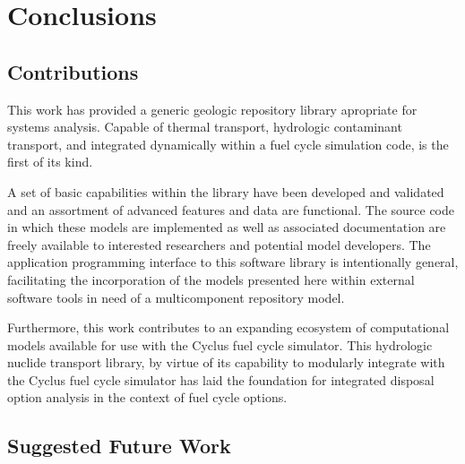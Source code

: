 \chapter{Conclusions}\label{ch:conclusion}
\section{Contributions}

This work has provided a generic geologic repository library apropriate for 
systems analysis. Capable of thermal transport, hydrologic contaminant 
transport, and integrated dynamically within a fuel cycle simulation code,
\Cyder is the first of its kind. 

A set of basic capabilities within the \Cyder library have been developed and
validated and an assortment of advanced features and data are functional.
The \Cyder source code in which these models are implemented as well as 
associated documentation are freely available to interested researchers and 
potential model developers. The application programming interface to this 
software library is intentionally general, facilitating the incorporation of 
the models presented here within external software tools in need of a 
multicomponent repository model.

Furthermore, this work contributes to an expanding ecosystem of computational 
models available for use with the Cyclus fuel cycle simulator. This hydrologic 
nuclide transport library, by virtue of its capability to modularly integrate 
with the Cyclus fuel cycle simulator has laid the foundation for integrated 
disposal option analysis in the context of fuel cycle options. 

\section{Suggested Future Work}
